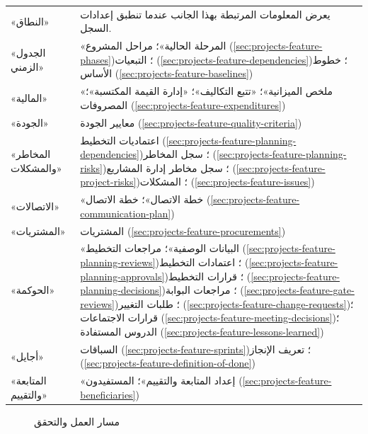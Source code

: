 \begin{table}[H]
\begin{tabularx}{\linewidth}{R{4.2cm} Y}
«النطاق» & يعرض المعلومات المرتبطة بهذا الجانب عندما تنطبق إعدادات السجل.\\
«الجدول الزمني» & «المرحلة الحالية»؛ مراحل المشروع (\ref{sec:projects-feature-phases})؛ التبعيات (\ref{sec:projects-feature-dependencies})؛ خطوط الأساس (\ref{sec:projects-feature-baselines})\\
«المالية» & «ملخص الميزانية»؛ «تتبع التكاليف»؛ «إدارة القيمة المكتسبة»؛ المصروفات (\ref{sec:projects-feature-expenditures})\\
«الجودة» & معايير الجودة (\ref{sec:projects-feature-quality-criteria})\\
«المخاطر والمشكلات» & اعتماديات التخطيط (\ref{sec:projects-feature-planning-dependencies})؛ سجل المخاطر (\ref{sec:projects-feature-planning-risks})؛ سجل مخاطر إدارة المشاريع (\ref{sec:projects-feature-project-risks})؛ المشكلات (\ref{sec:projects-feature-issues})\\
«الاتصالات» & «خطة الاتصال»؛ خطة الاتصال (\ref{sec:projects-feature-communication-plan})\\
«المشتريات» & المشتريات (\ref{sec:projects-feature-procurements})\\
«الحوكمة» & «البيانات الوصفية»؛ مراجعات التخطيط (\ref{sec:projects-feature-planning-reviews})؛ اعتمادات التخطيط (\ref{sec:projects-feature-planning-approvals})؛ قرارات التخطيط (\ref{sec:projects-feature-planning-decisions})؛ مراجعات البوابة (\ref{sec:projects-feature-gate-reviews})؛ طلبات التغيير (\ref{sec:projects-feature-change-requests})؛ قرارات الاجتماعات (\ref{sec:projects-feature-meeting-decisions})؛ الدروس المستفادة (\ref{sec:projects-feature-lessons-learned})\\
«أجايل» & السباقات (\ref{sec:projects-feature-sprints})؛ تعريف الإنجاز (\ref{sec:projects-feature-definition-of-done})\\
«المتابعة والتقييم» & «إعداد المتابعة والتقييم»؛ المستفيدون (\ref{sec:projects-feature-beneficiaries})\\
\end{tabularx}
\end{table}
\begin{figure}[H]
\centering
{}
\rclegend
\caption{مسار العمل والتحقق}
\label{fig:projects-projects-flow}
\end{figure}

